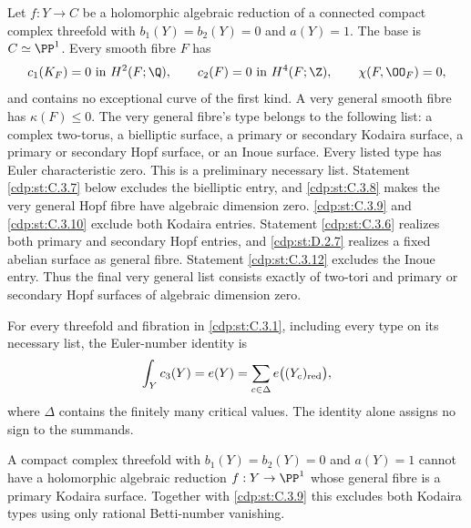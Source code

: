 \begin{proposition}\hypertarget{tag-01F4}{}\label{cdp:st:C.3.1}


Let $f:Y\to C$ be a holomorphic algebraic reduction of a connected
compact complex threefold with $b_1(Y)=b_2(Y)=0$ and $a(Y)=1$.
The base is $C\simeq\PP^1$. Every smooth fibre $F$ has
\[
 c_1(K_F)=0\text{ in }H^2(F;\Q),\qquad
 c_2(F)=0\text{ in }H^4(F;\Z),\qquad
 \chi(F,\OO_F)=0,
\]
and contains no exceptional curve of the first kind. A very general
smooth fibre has $\kappa(F)\leq0$. The very general fibre's type belongs to the following
list: a complex two-torus, a bielliptic surface, a primary or secondary
Kodaira surface, a primary or secondary Hopf surface, or an Inoue
surface. Every listed type has Euler characteristic zero. This is a
preliminary necessary list. Statement \ref{cdp:st:C.3.7} below excludes the
bielliptic entry, and \ref{cdp:st:C.3.8} makes the very general Hopf fibre have
algebraic dimension zero. \ref{cdp:st:C.3.9} and \ref{cdp:st:C.3.10} exclude both Kodaira
entries. Statement \ref{cdp:st:C.3.6} realizes both primary and secondary Hopf
entries, and \ref{cdp:st:D.2.7} realizes a fixed abelian surface as general
fibre. Statement \ref{cdp:st:C.3.12} excludes the Inoue entry. Thus the
final very general list consists exactly of two-tori and
primary or secondary Hopf surfaces of algebraic dimension zero.
\end{proposition}

\begin{proposition}\hypertarget{tag-01FB}{}\label{cdp:st:C.3.5}


For every threefold and fibration in \ref{cdp:st:C.3.1}, including every type on
its necessary list, the Euler-number identity is
\[
\int_Y c_3(Y)=e(Y)=\sum_{c\in\Delta}e\bigl((Y_c)_{\rm red}\bigr),
\]
where $\Delta$ contains the finitely many critical values.
The identity alone assigns no sign to the summands.
\end{proposition}

\begin{proposition}\hypertarget{tag-01F5}{}\label{cdp:st:C.3.10}



A compact complex threefold with $b_1(Y)=b_2(Y)=0$ and
$a(Y)=1$ cannot have a holomorphic algebraic reduction
$f:Y\to\PP^1$ whose general fibre is a primary Kodaira
surface. Together with \ref{cdp:st:C.3.9} this excludes both Kodaira
types using only rational Betti-number vanishing.
\end{proposition}

